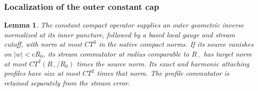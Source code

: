 \documentclass[11pt]{amsart}
\newtheorem{lemma}[theorem]{Lemma}
\theoremstyle{definition}
\theoremstyle{remark}
\theoremstyle{plain}
\begin{document}
\subsubsection{Localization of the outer constant cap}

\begin{lemma}\label{lem:excision-outer-constant-cap}
The constant compact operator supplies an outer geometric
inverse normalized at its inner puncture, followed by a
based local gauge and stream cutoff, with norm at most
$CT^3$ in the native compact norms. If its source vanishes
on $|w|<cR_0$, its stream commutator at radius comparable
to $R_-$ has target norm at most
$CT^2(R_-/R_0)$ times the source norm.
Its exact and harmonic attaching profiles have size at most
$CT^2$ times that norm. The profile commutator is retained
separately from the stream error.
\end{lemma}
\end{document}
